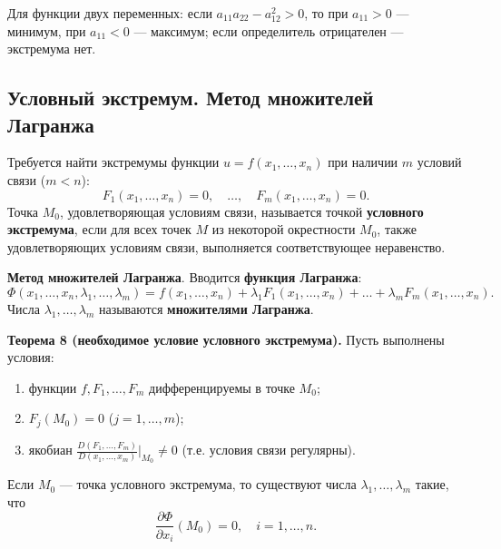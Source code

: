 \documentclass{article}
\theoremstyle{definition}
\begin{document}
Для функции двух переменных: если $a_{11}a_{22}-a_{12}^2>0$, то при $a_{11}>0$ — минимум, при $a_{11}<0$ — максимум; если определитель отрицателен — экстремума нет.

\subsection{Условный экстремум. Метод множителей Лагранжа}
Требуется найти экстремумы функции $u=f(x_1,\dots,x_n)$ при наличии $m$ условий связи ($m<n$):
\[
F_1(x_1,\dots,x_n)=0,\quad\dots,\quad F_m(x_1,\dots,x_n)=0.
\]
Точка $M_0$, удовлетворяющая условиям связи, называется точкой \textbf{условного экстремума}, если для всех точек $M$ из некоторой окрестности $M_0$, также удовлетворяющих условиям связи, выполняется соответствующее неравенство.

\textbf{Метод множителей Лагранжа}. Вводится \textbf{функция Лагранжа}:
\[
\Phi(x_1,\dots,x_n,\lambda_1,\dots,\lambda_m)=f(x_1,\dots,x_n)+\lambda_1F_1(x_1,\dots,x_n)+\dots+\lambda_mF_m(x_1,\dots,x_n).
\]
Числа $\lambda_1,\dots,\lambda_m$ называются \textbf{множителями Лагранжа}.

\textbf{Теорема 8 (необходимое условие условного экстремума).} Пусть выполнены условия:
\begin{enumerate}
    \item функции $f,F_1,\dots,F_m$ дифференцируемы в точке $M_0$;
    \item $F_j(M_0)=0$ ($j=1,\dots,m$);
    \item якобиан $\frac{D(F_1,\dots,F_m)}{D(x_1,\dots,x_m)}\big|_{M_0}\neq0$ (т.е. условия связи регулярны).
\end{enumerate}
Если $M_0$ — точка условного экстремума, то существуют числа $\lambda_1,\dots,\lambda_m$ такие, что
\[
\frac{\partial\Phi}{\partial x_i}(M_0)=0,\quad i=1,\dots,n.
\]
\end{document}

